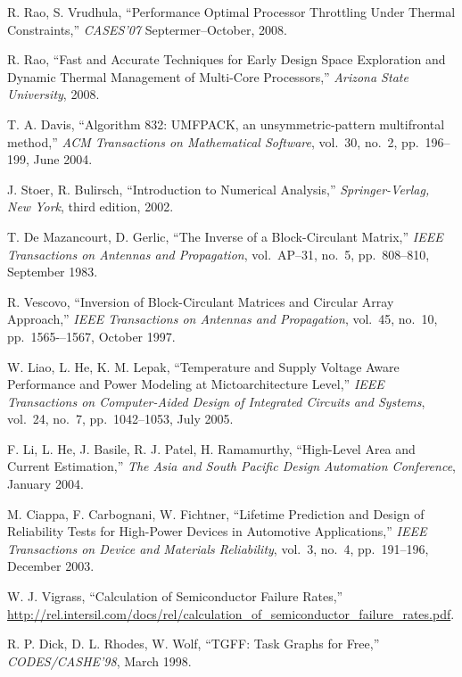 \begin{thebibliography}{99}
    R. Rao, S. Vrudhula,
    ``Performance Optimal Processor Throttling Under Thermal Constraints,''
    \emph{CASES'07}
    Septermer--October, 2008.

    R. Rao,
    ``Fast and Accurate Techniques for Early Design Space Exploration and Dynamic Thermal Management of Multi-Core Processors,''
    \emph{Arizona State University},
    2008.

    T. A. Davis,
    ``Algorithm 832: UMFPACK, an unsymmetric-pattern multifrontal method,''
    \emph{ACM Transactions on Mathematical Software},
    vol.~30, no.~2, pp.~196--199, June 2004.

    J. Stoer, R. Bulirsch,
    ``Introduction to Numerical Analysis,''
    \emph{Springer-Verlag, New York},
    third edition, 2002.

    T. De Mazancourt, D. Gerlic,
    ``The Inverse of a Block-Circulant Matrix,''
    \emph{IEEE Transactions on Antennas and Propagation},
    vol.~AP–31, no.~5, pp.~808–810, September 1983.

    R. Vescovo,
    ``Inversion of Block-Circulant Matrices and Circular Array Approach,''
    \emph{IEEE Transactions on Antennas and Propagation},
    vol.~45, no.~10, pp.~1565-–1567, October 1997.

    W. Liao, L. He, K. M. Lepak,
    ``Temperature and Supply Voltage Aware Performance and Power Modeling at Mictoarchitecture Level,''
    \emph{IEEE Transactions on Computer-Aided Design of Integrated Circuits and Systems},
    vol.~24, no.~7, pp.~1042--1053, July 2005.

    F. Li, L. He, J. Basile, R. J. Patel, H. Ramamurthy,
    ``High-Level Area and Current Estimation,''
    \emph{The Asia and South Pacific Design Automation Conference},
    January 2004.

    M. Ciappa, F. Carbognani, W. Fichtner,
    ``Lifetime Prediction and Design of Reliability Tests for High-Power Devices in Automotive Applications,''
    \emph{IEEE Transactions on Device and Materials Reliability},
    vol.~3, no.~4, pp.~191--196, December 2003.

    W. J. Vigrass,
    ``Calculation of Semiconductor Failure Rates,''
    \url{http://rel.intersil.com/docs/rel/calculation_of_semiconductor_failure_rates.pdf}.

    R. P. Dick, D. L. Rhodes, W. Wolf,
    ``TGFF: Task Graphs for Free,''
    \emph{CODES/CASHE'98},
    March 1998.


\end{thebibliography}
